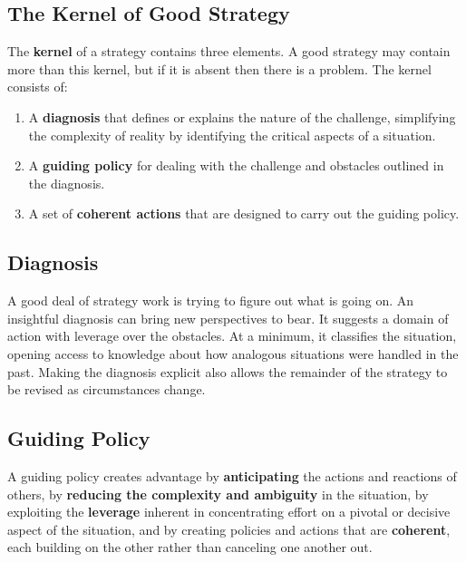 \documentclass{article}
\newenvironment{nosepenumerate}
{ \begin{enumerate}
    \setlength{\itemsep}{0pt}
    \setlength{\parskip}{0pt}
    \setlength{\parsep}{0pt}     }
{ \end{enumerate}                  }
\begin{document}
\begin{center}
\section{The Kernel of Good Strategy}
\end{center}

\begin{multicols}{2}

\noindent
The \textbf{kernel} of a strategy contains three elements. A good strategy may contain more than this kernel, but if it is absent then there is a problem. The kernel consists of:

\begin{nosepenumerate}
    \item A \textbf{diagnosis} that defines or explains the nature of the challenge, simplifying the complexity of reality by identifying the critical aspects of a situation.
    \item A \textbf{guiding policy} for dealing with the challenge and obstacles outlined in the diagnosis. 
    \item A set of \textbf{coherent actions} that are designed to carry out the guiding policy.
\end{nosepenumerate}

\subsection{Diagnosis}

A good deal of strategy work is trying to figure out what is going on. An insightful diagnosis can bring new perspectives to bear. It suggests a domain of action with leverage over the obstacles. At a minimum, it classifies the situation, opening access to knowledge about how analogous situations were handled in the past. Making the diagnosis explicit also allows the remainder of the strategy to be revised as circumstances change.

\subsection{Guiding Policy}

A guiding policy creates advantage by \textbf{anticipating} the actions and reactions of others, by \textbf{reducing the complexity and ambiguity} in the situation, by exploiting the \textbf{leverage} inherent in concentrating effort on a pivotal or decisive aspect of the situation, and by creating policies and actions that are \textbf{coherent}, each building on the other rather than canceling one another out.


\end{multicols}
\end{document}
